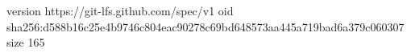 version https://git-lfs.github.com/spec/v1
oid sha256:d588b16c25e4b9746c804eac90278c69bd648573aa445a719bad6a379c060307
size 165
